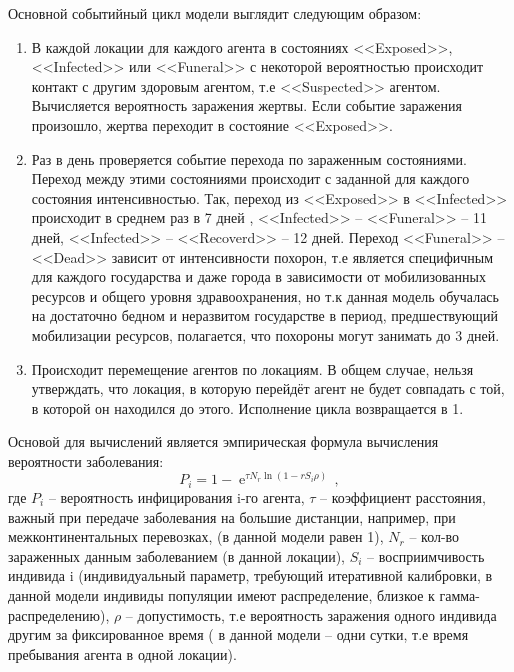 Основной событийный цикл модели выглядит следующим образом:
\begin{enumerate}
	\item В каждой локации для каждого агента в состояниях <<Exposed>>, <<Infected>> или <<Funeral>>  с некоторой вероятностью происходит контакт с другим   здоровым агентом, т.е <<Suspected>> агентом. Вычисляется вероятность заражения жертвы. Если событие заражения произошло, жертва переходит в состояние <<Exposed>>.
	\item Раз в день проверяется событие перехода по зараженным состояниями. Переход между этими состояниями происходит с заданной для каждого состояния интенсивностью. Так, переход из <<Exposed>> в <<Infected>> происходит в среднем раз в 7 дней %
	\cite{ncbi:2014} ,  <<Infected>> -- <<Funeral>> -- 11 дней, <<Infected>> -- <<Recoverd>> -- 12 дней. Переход <<Funeral>> -- <<Dead>> зависит от интенсивности похорон, т.е является специфичным для каждого государства и даже города в зависимости от мобилизованных ресурсов и общего уровня здравоохранения, но т.к данная модель обучалась на достаточно бедном и неразвитом государстве в период, предшествующий мобилизации ресурсов, полагается, что похороны могут занимать до 3 дней. 
	\item Происходит перемещение агентов по локациям. В общем случае, нельзя утверждать, что локация, в которую перейдёт агент не будет совпадать с той, в которой он находился до этого. Исполнение цикла возвращается в 1. 
\end{enumerate}

Основой для вычислений является эмпирическая формула  вычисления вероятности заболевания:
\begin{equation}\label{stohastic_eq:1}
P_i = 1 - \operatorname{e}^{\tau N_r \ln(1-rS_i\rho)} \,,
\end{equation}
где $P_i$ -- вероятность инфицирования  i-го агента, $\tau$  -- коэффициент расстояния, важный при передаче заболевания на большие дистанции, например, при межконтинентальных перевозках, (в данной модели равен 1), $N_r$ -- кол-во зараженных данным заболеванием (в данной локации), $S_i$ -- восприимчивость индивида i (индивидуальный параметр, требующий итеративной калибровки, в данной модели индивиды популяции имеют распределение, близкое к гамма-распределению), $\rho$ -- допустимость, т.е вероятность заражения одного индивида другим за фиксированное время ( в данной модели -- одни сутки, т.е время пребывания агента в одной локации).


